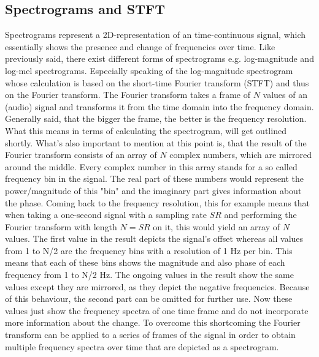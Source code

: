 \subsection{Spectrograms and STFT}
Spectrograms represent a 2D-representation of an time-continuous signal, which essentially shows the presence and change of frequencies over time. Like previously said, there exist different forms of spectrograms e.g. log-magnitude and log-mel spectrograms. Especially speaking of the log-magnitude spectrogram whose calculation is based on the short-time Fourier transform (STFT) and thus on the Fourier transform. The Fourier transform takes a frame of $N$ values of an (audio) signal and transforms it from the time domain into the frequency domain. Generally said, that the bigger the frame, the better is the frequency resolution. What this means in terms of calculating the spectrogram, will get outlined shortly. What's also important to mention at this point is, that the result of the Fourier transform consists of an array of $N$ complex numbers, which are mirrored around the middle. Every complex number in this array stands for a so called frequency bin in the signal. The real part of these numbers would represent the power/magnitude of this "bin" and the imaginary part gives information about the phase. Coming back to the frequency resolution, this for example means that when taking a one-second signal with a sampling rate $SR$ and performing the Fourier transform with length $N=SR$ on it, this would yield an array of $N$ values. The first value in the result depicts the signal's offset whereas all values from 1 to N/2 are the frequency bins with a resolution of 1 Hz per bin. This means that each of these bins shows the magnitude and also phase of each frequency from 1 to N/2 Hz. The ongoing values in the result show the same values except they are mirrored, as they depict the negative frequencies. Because of this behaviour, the second part can be omitted for further use. Now these values just show the frequency spectra of one time frame and do not incorporate more information about the change. To overcome this shortcoming the Fourier transform can be applied to a series of frames of the signal in order to obtain multiple frequency spectra over time that are depicted as a spectrogram.

